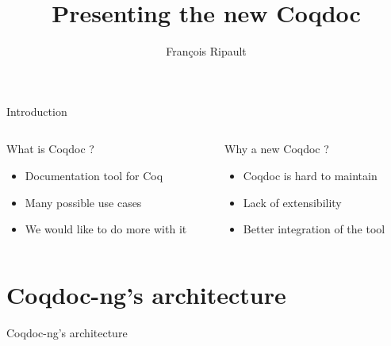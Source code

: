 \documentclass[compress]{beamer}
\title{Presenting the new Coqdoc}
\author{François Ripault}
\begin{document}
\begin{frame}
\titlepage
\end{frame}

\begin{frame}{Introduction}
  \begin{columns}[2]

    \begin{column}{0.5\textwidth}
      What is Coqdoc ?
      \begin{itemize}
        \item Documentation tool for Coq
        \item Many possible use cases
        \item We would like to do more with it
      \end{itemize}
    \end{column}

    \begin{column}{0.5\textwidth}
      Why a new Coqdoc ?
      \begin{itemize}[<+->]
        \item Coqdoc is hard to maintain
        \item Lack of extensibility
        \item Better integration of the tool
      \end{itemize}
    \end{column}

  \end{columns}
\end{frame}

\begin{frame}
  \tableofcontents
\end{frame}

\section{Coqdoc-ng's architecture}
  \begin{frame}{Coqdoc-ng's architecture}
    
  \end{frame}
\end{document}
